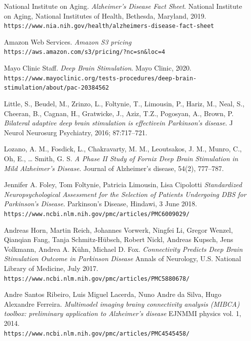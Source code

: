 \documentclass{article}
\begin{document}
\begin{thebibliography}{9}


National Institute on Aging. 
\textit{Alzheimer's Disease Fact Sheet}. 
National Institute on Aging, National Institutes of Health, Bethesda, Maryland, 2019.
\\\texttt{https://www.nia.nih.gov/health/alzheimers-disease-fact-sheet}

Amazon Web Services.
\textit{Amazon S3 pricing}
\\\texttt{https://aws.amazon.com/s3/pricing/?nc=sn\&loc=4}

Mayo Clinic Staff. 
\textit{Deep Brain Stimulation}. 
Mayo Clinic, 2020.
\\\texttt{https://www.mayoclinic.org/tests-procedures/deep-brain-stimulation/about/pac-20384562}

Little, S., Beudel, M., Zrinzo, L., Foltynie, T., Limousin, P., Hariz, M., Neal, S., Cheeran, B., Cagnan, H., Gratwicke, J., Aziz, T.Z., Pogosyan, A., Brown, P. 
\textit{Bilateral adaptive deep brain stimulation is effectivein Parkinson’s disease}. 
J Neurol Neurosurg Psychiatry, 2016; 87:717–721.

Lozano, A. M., Fosdick, L., Chakravarty, M. M., Leoutsakos, J. M., Munro, C., Oh, E., … Smith, G. S. 
\textit{A Phase II Study of Fornix Deep Brain Stimulation in Mild Alzheimer’s Disease}. 
Journal of Alzheimer's disease, 54(2), 777–787. 

Jennifer A. Foley, Tom Foltynie, Patricia Limousin, Lisa Cipolotti
\textit{Standardized Neuropsychological Assessment for the Selection of Patients Undergoing DBS for Parkinson's Disease}.
Parkinson's Disease, Hindawi, 3 June 2018.
\\\texttt{https://www.ncbi.nlm.nih.gov/pmc/articles/PMC6009029/}

Andreas Horn, Martin Reich, Johannes Vorwerk, Ningfei Li, Gregor Wenzel, Qianqian Fang, Tanja Schmitz-Hübsch, Robert Nickl, Andreas Kupsch, Jens Volkmann, Andrea A. Kühn, Michael D. Fox.
\textit{Connectivity Predicts Deep Brain Stimulation Outcome in Parkinson Disease}
Annals of Neurology, U.S. National Library of Medicine, July 2017.
\\\texttt{https://www.ncbi.nlm.nih.gov/pmc/articles/PMC5880678/}

Andre Santos Ribeiro, Luis Miguel Lacerda, Nuno Andre da Silva, Hugo Alexandre Ferreira.
\textit{Multimodel imaging brainy connectivity analysis (MIBCA) toolbox: preliminary application to Alzheimer's disease}
EJNMMI physics vol. 1, 2014.
\\\texttt{https://www.ncbi.nlm.nih.gov/pmc/articles/PMC4545458/}

\end{thebibliography}
\end{document}
